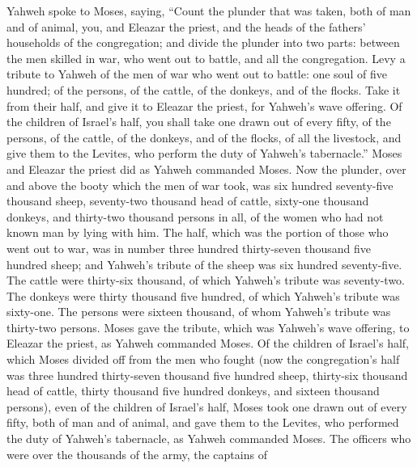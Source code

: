  Yahweh spoke to Moses, saying,  ``Count
the plunder that was taken, both of man and of animal, you, and Eleazar
the priest, and the heads of the fathers' households of the
congregation;  and divide the plunder into two parts:
between the men skilled in war, who went out to battle, and all the
congregation.  Levy a tribute to Yahweh of the men of war
who went out to battle: one soul of five hundred; of the persons, of the
cattle, of the donkeys, and of the flocks.  Take it from
their half, and give it to Eleazar the priest, for Yahweh's wave
offering.  Of the children of Israel's half, you shall
take one drawn out of every fifty, of the persons, of the cattle, of the
donkeys, and of the flocks, of all the livestock, and give them to the
Levites, who perform the duty of Yahweh's tabernacle.'' 
Moses and Eleazar the priest did as Yahweh commanded Moses.
 Now the plunder, over and above the booty which the men
of war took, was six hundred seventy-five thousand sheep,
 seventy-two thousand head of cattle, 
sixty-one thousand donkeys,  and thirty-two thousand
persons in all, of the women who had not known man by lying with him.
 The half, which was the portion of those who went out to
war, was in number three hundred thirty-seven thousand five hundred
sheep;  and Yahweh's tribute of the sheep was six hundred
seventy-five.  The cattle were thirty-six thousand, of
which Yahweh's tribute was seventy-two.  The donkeys were
thirty thousand five hundred, of which Yahweh's tribute was sixty-one.
 The persons were sixteen thousand, of whom Yahweh's
tribute was thirty-two persons.  Moses gave the tribute,
which was Yahweh's wave offering, to Eleazar the priest, as Yahweh
commanded Moses.  Of the children of Israel's half, which
Moses divided off from the men who fought  (now the
congregation's half was three hundred thirty-seven thousand five hundred
sheep,  thirty-six thousand head of cattle,
 thirty thousand five hundred donkeys, 
and sixteen thousand persons),  even of the children of
Israel's half, Moses took one drawn out of every fifty, both of man and
of animal, and gave them to the Levites, who performed the duty of
Yahweh's tabernacle, as Yahweh commanded Moses.  The
officers who were over the thousands of the army, the captains of
